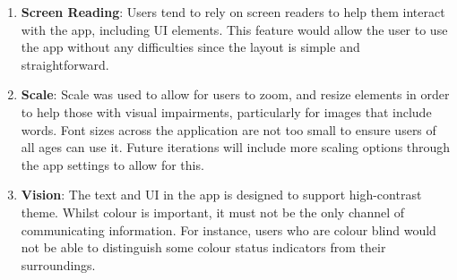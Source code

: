 \begin{enumerate}
	\item \textbf{Screen Reading}: Users tend to rely on screen readers to help them interact with the app, including UI elements. This feature would allow the user to use the app without any difficulties since the layout is simple and straightforward. 

	\item \textbf{Scale}: Scale was used to allow for users to zoom, and resize elements in order to help those with visual impairments, particularly for images that include words. Font sizes across the application are not too small to ensure users of all ages can use it. Future iterations will include more scaling options through the app settings to allow for this.

	\item \textbf{Vision}: The text and UI in the app is designed to support high-contrast theme. Whilst colour is important, it must not be the only channel of communicating information. For instance, users who are colour blind would not be able to distinguish some colour status indicators from their surroundings.
    
\end{enumerate}